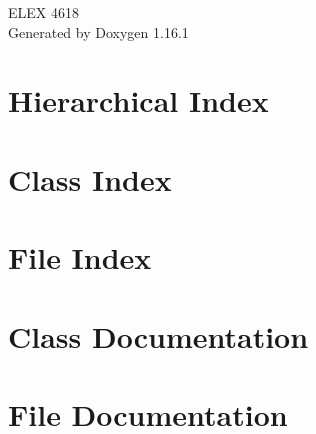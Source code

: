 \documentclass[twoside]{book}
\newcommand{\+}{\discretionary{\mbox{\scriptsize$\hookleftarrow$}}{}{}}
\newcommand{\clearemptydoublepage}{%
    \newpage{\pagestyle{empty}\cleardoublepage}%
  }
\begin{document}
  \raggedbottom
    \hypersetup{pageanchor=false,
                bookmarksnumbered=true,
                pdfencoding=unicode
               }
  \begin{titlepage}
  \vspace*{7cm}
  \begin{center}%
  {\Large ELEX 4618}\\
  \vspace*{1cm}
  {\large Generated by Doxygen 1.16.1}\\
  \end{center}
  \end{titlepage}
  \clearemptydoublepage
  \tableofcontents
  \clearemptydoublepage
  \hypersetup{pageanchor=true}
\chapter{Hierarchical Index}

\chapter{Class Index}

\chapter{File Index}

\chapter{Class Documentation}












\chapter{File Documentation}








  \backmatter
  \newpage
  \clearemptydoublepage
  \printindex
\end{document}
